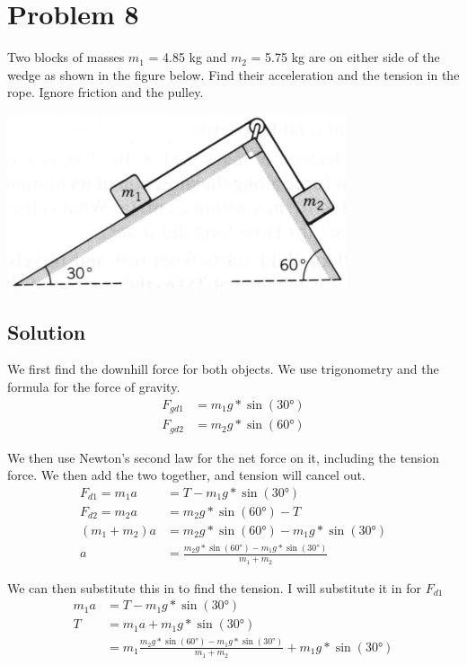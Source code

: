 \documentclass[12pt]{article}
\begin{document}
\pagebreak
\section*{Problem 8}
Two blocks of masses $m_1$ = 4.85 kg and $m_2$ = 5.75 kg are on either side of the wedge as shown in the figure below. Find their acceleration and the tension in the rope. Ignore friction and the pulley.

\begin{center}
    \includegraphics*[width=10cm]{graph_8.png}
\end{center}

\subsection*{Solution}
We first find the downhill force for both objects. We use trigonometry and the formula for the force of gravity.
\begin{align*}
    F_{gd1} &= m_1 g * \sin(30\unit{\degree})\\
    F_{gd2} &= m_2 g * \sin(60\unit{\degree})
\end{align*}

We then use Newton's second law for the net force on it, including the tension force. We then add the two together, and tension will cancel out.
\begin{align*}
    F_{d1} = m_1 a &= T - m_1 g * \sin(30\unit{\degree})\\
    F_{d2} = m_2 a &= m_2 g * \sin(60\unit{\degree}) - T\\
    (m_1 + m_2)a &= m_2 g * \sin(60\unit{\degree}) - m_1 g * \sin(30\unit{\degree})\\
    a &= \frac{m_2 g * \sin(60\unit{\degree}) - m_1 g * \sin(30\unit{\degree})}{m_1 + m_2}
\end{align*}

We can then substitute this in to find the tension. I will substitute it in for $F_{d1}$
\begin{align*}
    m_1 a &= T - m_1 g * \sin(30\unit{\degree})\\
    T &= m_1 a + m_1 g * \sin(30\unit{\degree})\\
        &= m_1 \frac{m_2 g * \sin(60\unit{\degree}) - m_1 g * \sin(30\unit{\degree})}{m_1 + m_2} + m_1 g * \sin(30\unit{\degree})
\end{align*}
\end{document}

